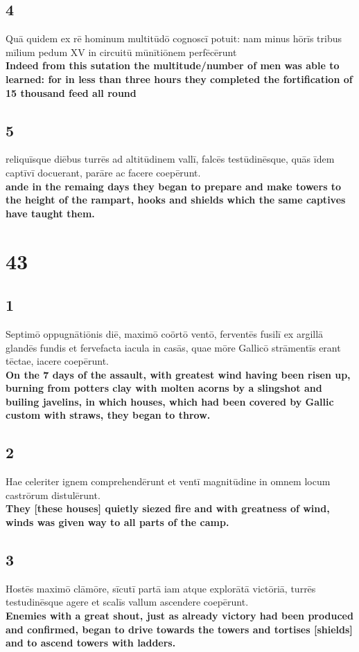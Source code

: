 \documentclass{article}
\begin{document}
\subsection*{4}
Quā quidem ex rē hominum multitūdō cognoscī potuit: nam minus hōrīs tribus mīlium pedum XV in circuitū mūnītiōnem perfēcērunt  \\
\textbf{Indeed from this sutation the multitude/number of men was able to learned: for in less than three hours they completed the fortification of 15 thousand feed all round}

\subsection*{5}
reliquīsque diēbus turrēs ad altitūdinem vallī, falcēs testūdinēsque, quās īdem captīvī docuerant, parāre ac facere coepērunt. \\
\textbf{ande in the remaing days they began to prepare and make towers to the height of the rampart, hooks and shields which the same captives have taught them.}

\section*{43}

\subsection*{1}
Septimō oppugnātiōnis diē, maximō coörtō ventō, ferventēs fusilī ex argillā glandēs fundis et fervefacta iacula in casās, quae mōre Gallicō strāmentīs erant tēctae, iacere coepērunt. \\
\textbf{On the 7 days of the assault, with greatest wind having been risen up, burning from potters clay with molten acorns by a slingshot and builing javelins, in which houses, which had been covered by Gallic custom with straws, they began to throw.}

\subsection*{2}
Hae celeriter ignem comprehendērunt et ventī magnitūdine in omnem locum castrōrum distulērunt.\\
\textbf{They [these houses] quietly siezed fire and with greatness of wind, winds was given way to all parts of the camp.}

\subsection*{3}
Hostēs maximō clāmōre, sīcutī partā iam atque explorātā victōriā, turrēs testudinēsque agere et scalīs vallum ascendere coepērunt. \\
\textbf{Enemies with a great shout, just as already victory had been produced and confirmed, began to drive towards the towers and tortises [shields] and to ascend towers with ladders.}
\end{document}
